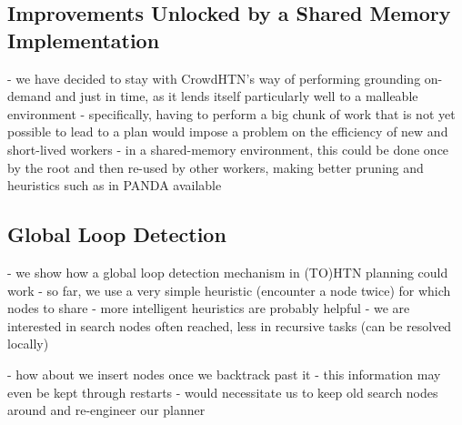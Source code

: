 \begin{comment}
\subsection{Lifted Parallel Search}
- the Crowd way of performing relatively simple search does not work out in the end
- we can still see some scaling for the parallel case
- lifted planning could massively shrink our search space (by an exponential factor in the number of nodes!)
- lilotane provides much intelligence on how to perform lifted search
- same as HyperTensioN
- a lilotane-like behavior may be the best from a practical perspective, as it is more consistent
- a search-based formulation may be easier to both parallelize and adapt to a malleable context - any search may be plugged in where CrowdHTN currently resides
\end{comment}

\subsection{Improvements Unlocked by a Shared Memory Implementation}
- we have decided to stay with CrowdHTN's way of performing grounding on-demand and just in time, as it lends itself particularly well to a malleable environment
- specifically, having to perform a big chunk of work that is not yet possible to lead to a plan would impose a problem on the efficiency of new and short-lived workers
- in a shared-memory environment, this could be done once by the root and then re-used by other workers, making better pruning and heuristics such as in PANDA available

\subsection{Global Loop Detection}
- we show how a global loop detection mechanism in (TO)HTN planning could work
- so far, we use a very simple heuristic (encounter a node twice) for which nodes to share
- more intelligent heuristics are probably helpful
- we are interested in search nodes often reached, less in recursive tasks (can be resolved locally)

- how about we insert nodes once we backtrack past it
	- this information may even be kept through restarts
	- would necessitate us to keep old search nodes around and re-engineer our planner

